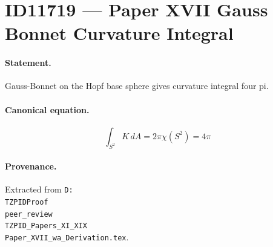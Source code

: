 \section*{ID11719 --- Paper XVII Gauss Bonnet Curvature Integral}

\paragraph{Statement.}
Gauss-Bonnet on the Hopf base sphere gives curvature integral four pi.

\paragraph{Canonical equation.}
\[
\int_{S^2}K\,dA=2\pi\chi(S^2)=4\pi
\]

\paragraph{Provenance.}
Extracted from \texttt{D:\\TZPIDProof\\peer\_review\\TZPID\_Papers\_XI\_XIX\\Paper\_XVII\_wa\_Derivation.tex}.
